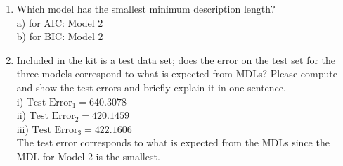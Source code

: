 \documentclass[english]{article}
\newcommand{\vx}{\mathbf{x}}
\begin{document}
\begin{enumerate}
\begin{enumerate}
\end{enumerate}


\item Which model has the smallest minimum description length? \\
a) for AIC: Model 2 \\
b) for BIC: Model 2\\


\item  Included in the kit is a test data set; does the error on the test set for the three models
   correspond to what is expected from MDLs?  Please compute and show the test errors and briefly explain it in one sentence. \\
i)   $\text{Test Error}_1 = 640.3078$ \\
ii)  $\text{Test Error}_2 = 420.1459$\\
iii) $\text{Test Error}_3 = 422.1606$\\
   The test error corresponds to what is expected from the MDLs since the MDL for Model 2 is the smallest. 


\end{enumerate}

\end{document}
